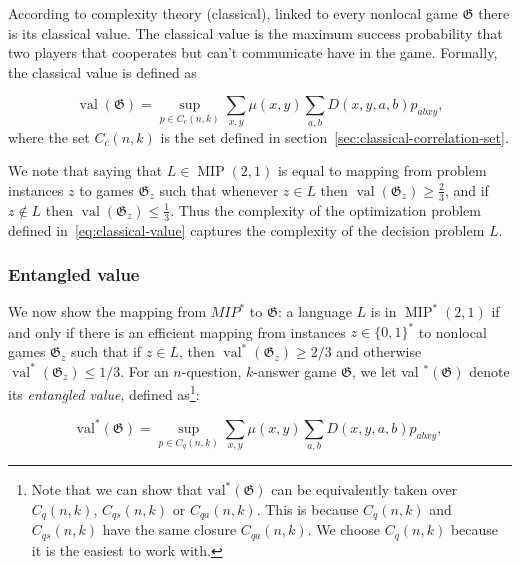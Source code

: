According to complexity theory (classical), linked to every nonlocal game $\mathfrak{G}$ there is its classical value. The classical value is the maximum success probability that two players that cooperates but can't communicate have in the game. Formally, the classical value is defined as

\begin{defn}\label{eq:classical-value}
\begin{equation}
\operatorname{val}(\mathfrak{G})=\sup _{p \in C_{c}(n, k)} \sum_{x, y} \mu(x, y) \sum_{a, b} D(x, y, a, b) p_{a b x y},
\end{equation}
where the set $C_{c}(n, k)$ is the set defined in section~\ref{sec:classical-correlation-set}.
\end{defn}

We note that saying that $L \in \operatorname{MIP}(2,1)$ is equal to mapping from problem instances $z$ to games $\mathfrak{G}_{z}$ such that whenever $z \in L$ then $\operatorname{val}\left(\mathfrak{G}_{z}\right) \geq \frac{2}{3}$, and if $z \notin L$ then $\operatorname{val}\left(\mathfrak{G}_{z}\right) \leq \frac{1}{3}$. Thus the complexity of the optimization problem defined in~\ref{eq:classical-value} captures the complexity of the decision problem $L$.

\subsubsection{Entangled value}\label{subsection:quantum-games}

We now show the mapping from $MIP^{*}$ to $\mathfrak{G}$: a language $L$ is in $\operatorname{MIP}^{*}(2,1)$ if and only if there is an efficient mapping from instances $z \in\{0,1\}^{*}$ to nonlocal games $\mathfrak{G}_{z}$ such that if $z \in L$, then $\operatorname{val}^{*}\left(\mathfrak{G}_{z}\right) \geq 2 / 3$ and otherwise $\operatorname{val}^{*}\left(\mathfrak{G}_{z}\right) \leq 1 / 3$.
 For an $n$-question, $k$-answer game $\mathfrak{G}$, we let val ${ }^{*}(\mathfrak{G})$ denote its \emph{entangled value}, defined as\footnote{Note that we can show that $\operatorname{val^{*}}(\mathfrak{G})$ can be equivalently taken over $C_{q}(n, k)$, $C_{q s}(n, k)$ or $C_{q a}(n, k)$. This is because $C_{q}(n, k)$ and $C_{q s}(n, k)$ have the same closure $C_{q a}(n, k)$. We choose $C_{q}(n, k)$ because it is the easiest to work with.}:

\begin{defn}\label{defn:entangled-value}
    \begin{equation}
    \operatorname{val^{*}}(\mathfrak{G})=\sup _{p \in C_{q}(n, k)} \sum_{x, y} \mu(x, y) \sum_{a, b} D(x, y, a, b) p_{a b x y},
    \end{equation}
\end{defn}


